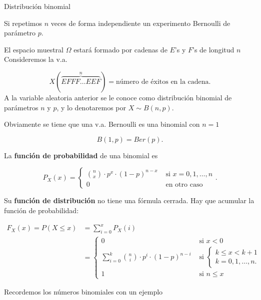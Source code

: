 \documentclass[
  letterpaper,
  DIV=11,
  numbers=noendperiod]{scrreprt}
\begin{document}
\begin{Definicion}{Distribución binomial}{}

Si repetimos \(n\) veces de forma independiente un experimento Bernoulli
de parámetro \(p\).

El espacio muestral \(\Omega\) estará formado por cadenas de \(E\)'s y
\(F\)'s de longitud \(n\) Consideremos la v.a.

\[X(\overbrace{EFFF\ldots EEF}^{n})=\mbox{número de éxitos en la cadena}.\]
A la variable aleatoria anterior se le conoce como distribución binomial
de parámetros \(n\) y \(p\), y lo denotaremos por \(X\sim B(n,p).\)

Obviamente se tiene que una v.a. Bernoulli es una binomial con \(n=1\)

\[B(1,p)=Ber(p).\]

\end{Definicion}

La \textbf{función de probabilidad} de una binomial es

\[
P_{X}(x)=\left\{
\begin{array}{ll}
{n\choose x}\cdot p^x \cdot(1-p)^{n-x} &\mbox{ si } x=0,1,\ldots,n\\
0 & \mbox{ en otro caso}
\end{array}\right..
\]

Su \textbf{función de distribución} no tiene una fórmula cerrada. Hay
que acumular la función de probabilidad:

\begin{align*}
F_{X}(x)=P(X\leq x)&=\sum_{i=0}^x P_X(i)\\ 
& =
\left\{
\begin{array}{ll}
0 & \mbox{ si } x<0\\\displaystyle
\sum_{i=0}^k {n\choose i}\cdot p^i \cdot (1-p)^{n-i} & \mbox{ si } 
\left\{
 \begin{array}{l} 
 k\leq x< k+1\\
 k=0,1,\ldots,n.
 \end{array}
\right.\\
1 & \mbox{ si } n\leq x
\end{array}
\right.
\end{align*}

Recordemos los números binomiales con un ejemplo
\end{document}
